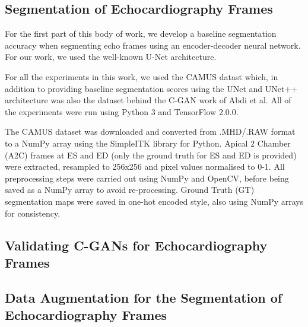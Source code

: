 \subsection{Segmentation of Echocardiography Frames}

For the first part of this body of work, we develop a baseline segmentation
accuracy when segmenting echo frames using an encoder-decoder neural network.
For our work, we used the well-known U-Net architecture. \newline

For all the experiments in this work, we used the CAMUS datast
\cite{leclercDeepLearningSegmentation2019} which, in addition to providing
baseline segmentation scores using the UNet and UNet++ architecture was also the
dataset behind the C-GAN work of Abdi et al. All of the experiments were run
using Python 3 and TensorFlow 2.0.0.\newline

The CAMUS dataset was downloaded and converted from .MHD/.RAW format to a NumPy
array using the SimpleITK library for Python. Apical 2 Chamber (A2C) frames at
ES and ED (only the ground truth for ES and ED is provided) were extracted,
resampled to 256x256 and pixel values normalised to 0-1. All preprocessing steps
were carried out using NumPy and OpenCV, before being saved as a NumPy array to
avoid re-processing. Ground Truth (GT) segmentation maps were saved in one-hot
encoded style, also using NumPy arrays for consistency. \newline

\subsection{Validating C-GANs for Echocardiography Frames}

\subsection{Data Augmentation for the Segmentation of Echocardiography Frames}